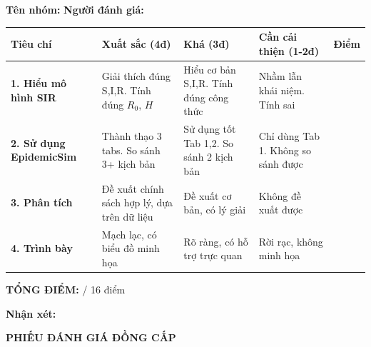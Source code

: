 \documentclass[12pt,a4paper]{article}
\begin{document}
\vspace{0.3cm}
\noindent\textbf{Tên nhóm:} \underline{\hspace{4cm}} \hfill \textbf{Người đánh giá:} \underline{\hspace{4cm}}

\vspace{0.5cm}
\begin{tabularx}{\textwidth}{|>{\raggedright\arraybackslash}p{2.5cm}|>{\raggedright\arraybackslash}X|>{\raggedright\arraybackslash}X|>{\raggedright\arraybackslash}X|c|}
\hline
\rowcolor{TableHeader}
\sffamily\bfseries Tiêu chí & \sffamily\bfseries Xuất sắc (4đ) & \sffamily\bfseries Khá (3đ) & \sffamily\bfseries Cần cải thiện (1-2đ) & \sffamily\bfseries Điểm \\
\hline
\textbf{1. Hiểu mô hình SIR} & Giải thích đúng S,I,R. Tính đúng $R_0$, $H$ & Hiểu cơ bản S,I,R. Tính đúng công thức & Nhầm lẫn khái niệm. Tính sai & \underline{\hspace{1cm}} \\
\hline
\textbf{2. Sử dụng EpidemicSim} & Thành thạo 3 tabs. So sánh 3+ kịch bản & Sử dụng tốt Tab 1,2. So sánh 2 kịch bản & Chỉ dùng Tab 1. Không so sánh được & \underline{\hspace{1cm}} \\
\hline
\textbf{3. Phân tích} & Đề xuất chính sách hợp lý, dựa trên dữ liệu & Đề xuất cơ bản, có lý giải & Không đề xuất được & \underline{\hspace{1cm}} \\
\hline
\textbf{4. Trình bày} & Mạch lạc, có biểu đồ minh họa & Rõ ràng, có hỗ trợ trực quan & Rời rạc, không minh họa & \underline{\hspace{1cm}} \\
\hline
\end{tabularx}

\vspace{0.5cm}
\noindent\textbf{TỔNG ĐIỂM:} \underline{\hspace{2cm}} / 16 điểm

\vspace{0.5cm}
\noindent\textbf{Nhận xét:}

\underline{\hspace{\textwidth}}

\underline{\hspace{\textwidth}}

\vspace{1cm}
\begin{center}
{\Large\bfseries\sffamily\color{primary} PHIẾU ĐÁNH GIÁ ĐỒNG CẤP}
\end{center}
\end{document}
